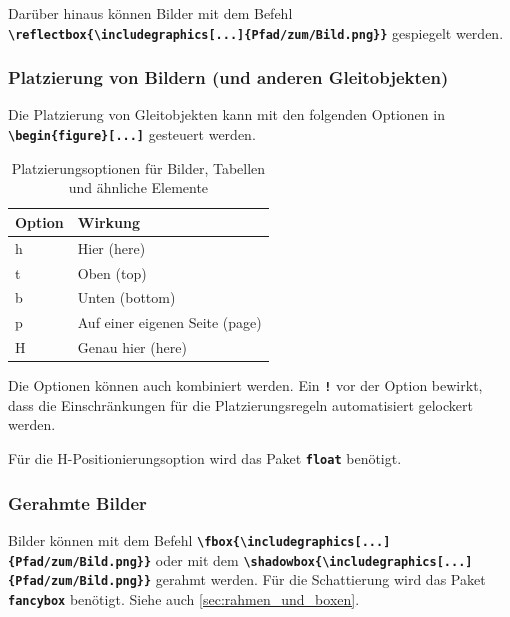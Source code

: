 Darüber hinaus können Bilder mit dem Befehl \texttt{\textbf{\textbackslash reflectbox\{\textbackslash includegraphics[...]\{Pfad/zum/Bild.png\}\}}} gespiegelt werden.

\subsubsection{Platzierung von Bildern (und anderen Gleitobjekten)}
Die Platzierung von Gleitobjekten kann mit den folgenden Optionen in \textbf{\texttt{\textbackslash begin\{figure\}[...]}} gesteuert werden.

\begin{table}[H]
    \centering
    \begin{tabular}{ll}
        \toprule
        \textbf{Option} & \textbf{Wirkung}               \\
        \midrule
        h               & Hier (here)                    \\
        t               & Oben (top)                     \\
        b               & Unten (bottom)                 \\
        p               & Auf einer eigenen Seite (page) \\
        H               & Genau hier (here)              \\
        \bottomrule
    \end{tabular}
    \caption{Platzierungsoptionen für Bilder, Tabellen und ähnliche Elemente}
    \label{tab:figure_options}
\end{table}
Die Optionen können auch kombiniert werden. Ein \textbf{\texttt{!}} vor der Option bewirkt, dass die Einschränkungen für die Platzierungsregeln automatisiert gelockert werden.

Für die H-Positionierungsoption wird das Paket \textbf{\texttt{float}} benötigt.

\newpage

\subsubsection{Gerahmte Bilder}
Bilder können mit dem Befehl \textbf{\texttt{\textbackslash fbox\{\textbackslash includegraphics[...]\{Pfad/zum/Bild.png\}\}}} oder mit dem \textbf{\texttt{\textbackslash shadowbox\{\textbackslash includegraphics[...]\{Pfad/zum/Bild.png\}\}}} gerahmt werden. Für die Schattierung wird das Paket \textbf{\texttt{fancybox}} benötigt. Siehe auch \autoref{sec:rahmen_und_boxen}.

